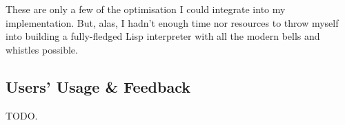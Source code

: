 \documentclass{article}
\begin{document}
    These are only a few of the optimisation I could integrate into my
    implementation. But, alas, I hadn't enough time nor resources to throw
    myself into building a fully-fledged Lisp interpreter with all the modern
    bells and whistles possible.

  \subsection{Users' Usage \& Feedback}
    TODO.

  \clearpage
  \let\Section\section
  \def\section*#1{\Section{#1}}

  \printbibliography
\end{document}
